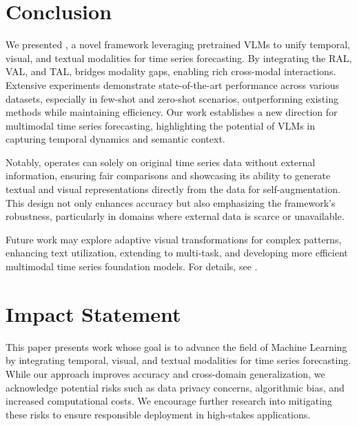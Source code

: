 \section{Conclusion}

We presented \method, a novel framework leveraging pretrained VLMs to unify temporal, visual, and textual modalities for time series forecasting. By integrating the RAL, VAL, and TAL, \method bridges modality gaps, enabling rich cross-modal interactions. Extensive experiments demonstrate state-of-the-art performance across various datasets, especially in few-shot and zero-shot scenarios, outperforming existing methods while maintaining efficiency. Our work establishes a new direction for multimodal time series forecasting, highlighting the potential of VLMs in capturing temporal dynamics and semantic context.

Notably, \method operates can solely on original time series data without external information, ensuring fair comparisons and showcasing its ability to generate textual and visual representations directly from the data for self-augmentation. This design not only enhances accuracy but also emphasizing the framework's robustness, particularly in domains where external data is scarce or unavailable.

Future work may explore adaptive visual transformations for complex patterns, enhancing text utilization, extending to multi-task, and developing more efficient multimodal time series foundation models. For details, see .


\section*{Impact Statement}

This paper presents work whose goal is to advance the field of Machine Learning by integrating temporal, visual, and textual modalities for time series forecasting. While our approach improves accuracy and cross-domain generalization, we acknowledge potential risks such as data privacy concerns, algorithmic bias, and increased computational costs. We encourage further research into mitigating these risks to ensure responsible deployment in high-stakes applications.